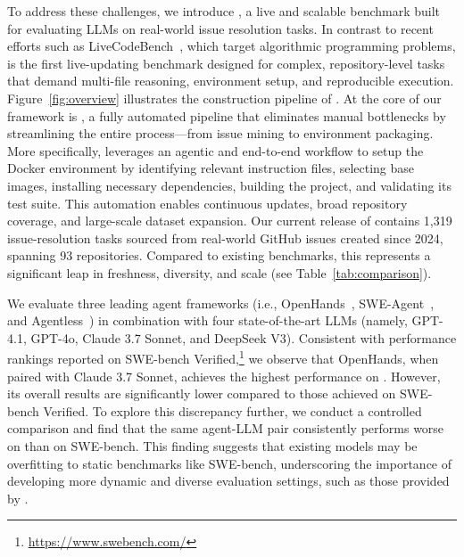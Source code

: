 To address these challenges, we introduce \benchmark{}, a live and scalable benchmark built for evaluating LLMs on real-world issue resolution tasks. 
In contrast to recent efforts such as LiveCodeBench~\cite{jain2024livecodebench}, which target algorithmic programming problems, \benchmark{} is the first live-updating benchmark designed for complex, repository-level tasks that demand multi-file reasoning, environment setup, and reproducible execution.
Figure~\ref{fig:overview} illustrates the construction pipeline of \benchmark{}. 
At the core of our framework is \method{}, a fully automated pipeline that eliminates manual bottlenecks by streamlining the entire process—from issue mining to environment packaging.
More specifically, \method{} leverages an agentic and end-to-end workflow to setup the Docker environment by identifying relevant instruction files, selecting base images, installing necessary dependencies, building the project, and validating its test suite.
This automation enables continuous updates, broad repository coverage, and large-scale dataset expansion.
Our current release of \benchmark{} contains 1,319 issue-resolution tasks sourced from real-world GitHub issues created since 2024, spanning 93 repositories.
Compared to existing benchmarks, this represents a significant leap in freshness, diversity, and scale (see Table~\ref{tab:comparison}).

We evaluate three leading agent frameworks (i.e., OpenHands~\cite{openhands}, SWE-Agent~\cite{sweagent}, and Agentless~\cite{xia2024agentless}) in combination with four state-of-the-art LLMs (namely, GPT-4.1, GPT-4o, Claude 3.7 Sonnet, and DeepSeek V3). Consistent with performance rankings reported on SWE-bench Verified,\footnote{\url{https://www.swebench.com/}} we observe that OpenHands, when paired with Claude 3.7 Sonnet, achieves the highest performance on \benchmark{}. However, its overall results are significantly lower compared to those achieved on SWE-bench Verified.
To explore this discrepancy further, we conduct a controlled comparison and find that the same agent-LLM pair consistently performs worse on \benchmark{} than on SWE-bench. This finding suggests that existing models may be overfitting to static benchmarks like SWE-bench, underscoring the importance of developing more dynamic and diverse evaluation settings, such as those provided by \benchmark{}.


